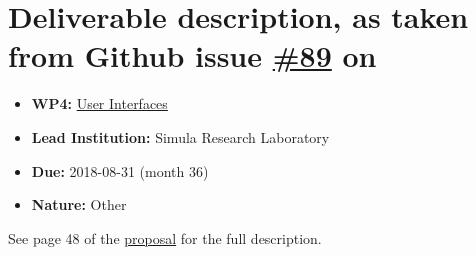 \section{\texorpdfstring{Deliverable description, as taken from Github
issue
\href{https://github.com/OpenDreamKit/OpenDreamKit/issues/89}{\#89}
on}{Deliverable description, as taken from Github issue \#89 on}}

\begin{itemize}
\tightlist
\item
  \textbf{WP4:}
  \href{https://github.com/OpenDreamKit/OpenDreamKit/tree/master/WP4}{User
  Interfaces}
\item
  \textbf{Lead Institution:} Simula Research Laboratory
\item
  \textbf{Due:} 2018-08-31 (month 36)
\item
  \textbf{Nature:} Other
\end{itemize}

See page 48 of the
\href{https://github.com/OpenDreamKit/OpenDreamKit/raw/master/Proposal/proposal-www.pdf}{proposal}
for the full description.
